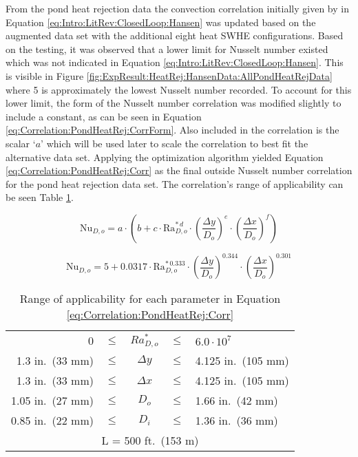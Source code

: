 		From the pond heat rejection data the convection correlation initially given by \cite{Hansen2011} in Equation \ref{eq:Intro:LitRev:ClosedLoop:Hansen} was updated based on the augmented data set with the additional eight heat SWHE configurations. Based on the testing, it was observed that a lower limit for Nusselt number existed which was not indicated in Equation \ref{eq:Intro:LitRev:ClosedLoop:Hansen}. This is visible in Figure \ref{fig:ExpResult:HeatRej:HansenData:AllPondHeatRejData} where 5 is approximately the lowest Nusselt number recorded.	To account for this lower limit, the form of the Nusselt number correlation was modified slightly to include a constant, as can be seen in Equation \ref{eq:Correlation:PondHeatRej:CorrForm}. Also included in the correlation is the scalar `$a$' which will be used later to scale the correlation to best fit the alternative data set. Applying the optimization algorithm yielded Equation \ref{eq:Correlation:PondHeatRej:Corr} as the final outside Nusselt number correlation for the pond heat rejection data set. The correlation's range of applicability can be seen Table \ref{tab:Correlation:PondHeatRej:RangeOfApp}.
		
\begin{equation}
	\mbox{Nu}_{D,o} = a \cdot \left( b+ c \cdot \mbox{Ra}_{D,o}^{* \, d} \cdot \left(\frac{\Delta y}{D_o}\right)^{e} \cdot \left(\frac{\Delta x}{D_o}\right)^{f} \right)
	\label{eq:Correlation:PondHeatRej:CorrForm}
\end{equation}

\begin{equation}
	\mbox{Nu}_{D,o} = 5+ 0.0317 \cdot \mbox{Ra}_{D,o}^{* \, 0.333} \cdot \left(\frac{\Delta y}{D_o}\right)^{0.344} \cdot \left(\frac{\Delta x}{D_o}\right)^{0.301}
	\label{eq:Correlation:PondHeatRej:Corr}
\end{equation}

	\begin{table}[h]
		\centering
		\caption[Range of applicability for pond heat rejection correlation]{Range of applicability for each parameter in Equation \ref{eq:Correlation:PondHeatRej:Corr}}
		\label{tab:Correlation:PondHeatRej:RangeOfApp}
		\begin{tabular}{r c c c l}
		0 & $\le$ &  $Ra_{D,o}^*$ & $\le$  & $6.0\cdot10^7$ \\
		1.3 in.\ (33 mm) & $\le$ & $\Delta y$ & $\le$ & 4.125 in.\ (105 mm) \\
		1.3 in.\ (33 mm) & $\le$ & $\Delta x$ & $\le$ & 4.125 in.\ (105 mm) \\
		1.05 in.\ (27 mm) & $\le$ &  $D_o$ &  $\le$ & 1.66 in.\ (42 mm) \\
		0.85 in.\ (22 mm) & $\le$ &  $D_i$ &  $\le$ & 1.36 in.\ (36 mm) \\
		\multicolumn{5}{c}{L = 500 ft.\ (153 m)} \\
		\end{tabular}
	\end{table}
			

